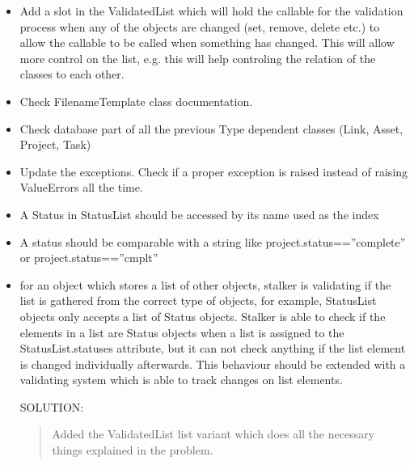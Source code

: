 \documentclass[a4paper,10pt,english]{sphinxmanual}
\begin{document}
\begin{itemize}
\item {} 
Add a slot in the ValidatedList which will hold the callable for the
validation process when any of the objects are changed (set, remove, delete
etc.) to allow the callable to be called when something has changed. This
will allow more control on the list, e.g. this will help controling the
relation of the classes to each other.

\item {} 
Check FilenameTemplate class documentation.

\item {} 
Check database part of all the previous Type dependent classes (Link, Asset,
Project, Task)

\item {} 
Update the exceptions. Check if a proper exception is raised instead of
raising ValueErrors all the time.

\item {} 
A Status in StatusList should be accessed by its name used as the index

\item {} 
A status should be comparable with a string like project.status==''complete''
or project.status==''cmplt''

\item {} 
for an object which stores a list of other objects, stalker is validating if
the list is gathered from the correct type of objects, for example,
StatusList objects only accepts a list of Status objects. Stalker is able to
check if the elements in a list are Status objects when a list is assigned
to the StatusList.statuses attribute, but it can not check anything if the
list element is changed individually afterwards. This behaviour should be
extended with a validating system which is able to track changes on list
elements.

SOLUTION:
\begin{quote}

Added the ValidatedList list variant which does all the necessary things
explained in the problem.
\end{quote}

\end{itemize}



\renewcommand{\indexname}{Index}
\printindex
\end{document}
